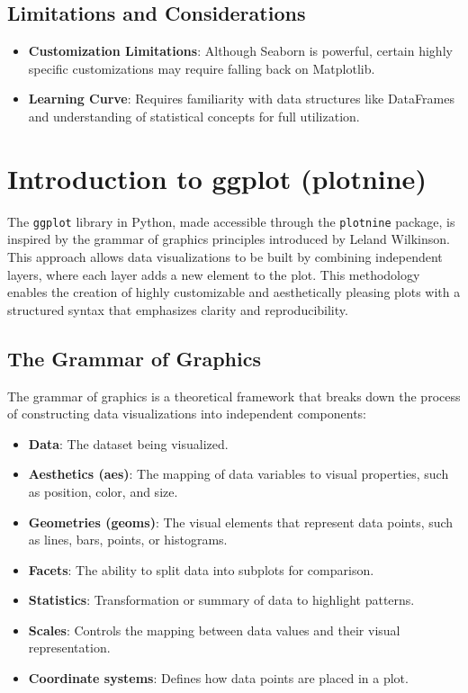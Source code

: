 \documentclass[
  letterpaper,
  DIV=11,
  numbers=noendperiod]{scrreprt}
\providecommand{\tightlist}{%
  \setlength{\itemsep}{0pt}\setlength{\parskip}{0pt}}\usepackage{longtable,booktabs,array}
\begin{document}
\hypertarget{limitations-and-considerations}{%
\subsection{Limitations and
Considerations}\label{limitations-and-considerations}}

\begin{itemize}
\tightlist
\item
  \textbf{Customization Limitations}: Although Seaborn is powerful,
  certain highly specific customizations may require falling back on
  Matplotlib.
\item
  \textbf{Learning Curve}: Requires familiarity with data structures
  like DataFrames and understanding of statistical concepts for full
  utilization.
\end{itemize}

\hypertarget{introduction-to-ggplot-plotnine}{%
\section{Introduction to ggplot
(plotnine)}\label{introduction-to-ggplot-plotnine}}

The \texttt{ggplot} library in Python, made accessible through the
\texttt{plotnine} package, is inspired by the grammar of graphics
principles introduced by Leland Wilkinson. This approach allows data
visualizations to be built by combining independent layers, where each
layer adds a new element to the plot. This methodology enables the
creation of highly customizable and aesthetically pleasing plots with a
structured syntax that emphasizes clarity and reproducibility.

\hypertarget{the-grammar-of-graphics}{%
\subsection{The Grammar of Graphics}\label{the-grammar-of-graphics}}

The grammar of graphics is a theoretical framework that breaks down the
process of constructing data visualizations into independent components:

\begin{itemize}
\tightlist
\item
  \textbf{Data}: The dataset being visualized.
\item
  \textbf{Aesthetics (aes)}: The mapping of data variables to visual
  properties, such as position, color, and size.
\item
  \textbf{Geometries (geoms)}: The visual elements that represent data
  points, such as lines, bars, points, or histograms.
\item
  \textbf{Facets}: The ability to split data into subplots for
  comparison.
\item
  \textbf{Statistics}: Transformation or summary of data to highlight
  patterns.
\item
  \textbf{Scales}: Controls the mapping between data values and their
  visual representation.
\item
  \textbf{Coordinate systems}: Defines how data points are placed in a
  plot.
\end{itemize}
\end{document}
